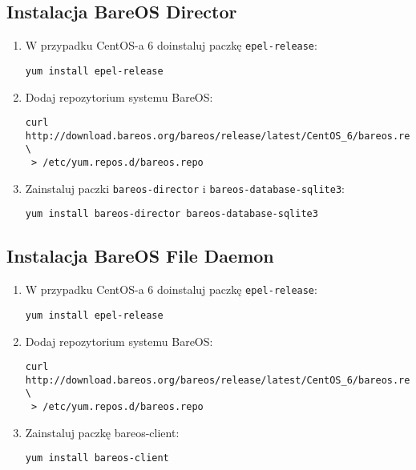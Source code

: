 \documentclass[polish]{article}
\begin{document}
\subsection*{Instalacja BareOS Director}

\begin{enumerate}

\item W przypadku CentOS-a 6 doinstaluj paczkę \texttt{epel-release}:
\begin{verbatim}
yum install epel-release
\end{verbatim}

\item Dodaj repozytorium systemu BareOS:
\begin{verbatim}
curl http://download.bareos.org/bareos/release/latest/CentOS_6/bareos.repo \
 > /etc/yum.repos.d/bareos.repo
\end{verbatim}

\item Zainstaluj paczki \texttt{bareos-director} i \texttt{bareos-database-sqlite3}:
\begin{verbatim}
yum install bareos-director bareos-database-sqlite3
\end{verbatim}

\end{enumerate}


\subsection*{Instalacja BareOS File Daemon}

\begin{enumerate}

\item W przypadku CentOS-a 6 doinstaluj paczkę \texttt{epel-release}:
\begin{verbatim}
yum install epel-release
\end{verbatim}

\item Dodaj repozytorium systemu BareOS:
\begin{verbatim}
curl http://download.bareos.org/bareos/release/latest/CentOS_6/bareos.repo \
 > /etc/yum.repos.d/bareos.repo
\end{verbatim}

\item Zainstaluj paczkę bareos-client:
\begin{verbatim}
yum install bareos-client
\end{verbatim}

\end{enumerate}
\end{document}
